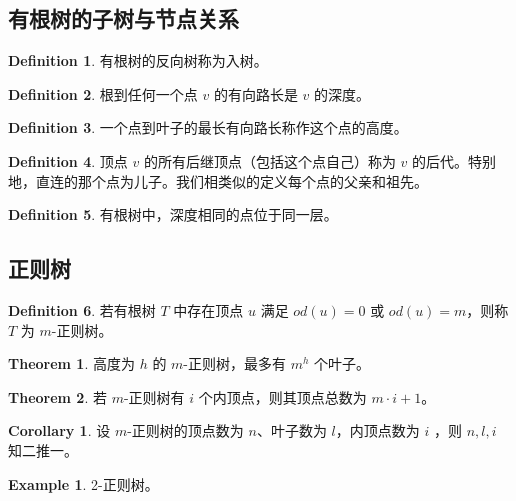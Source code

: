 \documentclass[oneside]{book}
\theoremstyle{definition}
\newtheorem{example}{Example}[section]
\newtheorem{definition}{Definition}[section]
\newtheorem{theorem}{Theorem}[section]
\newtheorem{corollary}{Corollary}[section]
\begin{document}
\subsection{有根树的子树与节点关系}

\begin{definition}
	有根树的反向树称为入树。
\end{definition}

\begin{definition}
	根到任何一个点 \(v\) 的有向路长是 \(v\) 的深度。
\end{definition}

\begin{definition}
	一个点到叶子的最长有向路长称作这个点的高度。
\end{definition}
\begin{definition}
	顶点 \( v \) 的所有后继顶点（包括这个点自己）称为 \( v \) 的后代。特别地，直连的那个点为儿子。我们相类似的定义每个点的父亲和祖先。
\end{definition}

\begin{definition}
	有根树中，深度相同的点位于同一层。
\end{definition}


\subsection{正则树}

\begin{definition}
	若有根树 \( T \) 中存在顶点 \( u \) 满足 \( od(u) = 0 \) 或 \( od(u) = m \)，则称 \( T \) 为 \( m \)-正则树。
\end{definition}

\begin{theorem}
	高度为 \( h \) 的 \( m \)-正则树，最多有 \( m^h \) 个叶子。
\end{theorem}

\begin{theorem}
	若 \( m \)-正则树有 \( i \) 个内顶点，则其顶点总数为 \( m \cdot i + 1 \)。
\end{theorem}

\begin{corollary}
	设 \( m \)-正则树的顶点数为 \( n \)、叶子数为 \( l \)，内顶点数为 \(i\) ，则 \(n,l,i\) 知二推一。
\end{corollary}

\begin{example}
	2-正则树。
\end{example}
\end{document}
